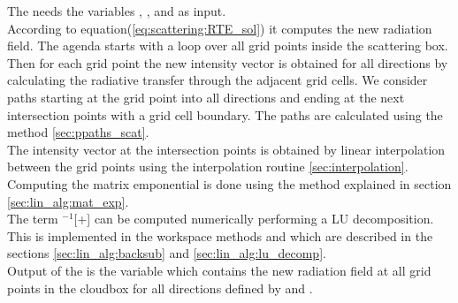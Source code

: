 \label{sec:scattering:RT_ag}
The  needs the variables
, , 
and   as input.\\ 
According to equation(\ref{eq:scattering:RTE_sol}) it computes the new
radiation field. The agenda starts with a loop over all grid points
inside the scattering box. Then for each grid point the new intensity
vector
 \StoVec  is obtained for all directions by calculating the
radiative transfer through the adjacent grid cells. We consider paths
starting at the grid point into all directions and ending at the next
intersection points with a grid cell boundary. The paths are calculated
using the method \ref{sec:ppaths_scat}.\\
 The intensity vector at
the intersection points  is obtained by linear interpolation
between the grid points using the interpolation routine
\ref{sec:interpolation}. \\
Computing the matrix emponential is done using the method
 explained in section
\ref{sec:lin_alg:mat_exp}.\\
 The term
\ExtMat$^{-1}$[\AbsVec\Planck+\ScaInt] can be computed numerically  
performing a LU decomposition. This is implemented in the workspace
methods  and  which are described
in the sections \ref{sec:lin_alg:backsub} and
\ref{sec:lin_alg:lu_decomp}. \\
Output of the  is the variable 
 which contains the new radiation field at all
grid points in the cloudbox for all directions defined by 
 and .

\label{sec:scattering:conv_method}





 


